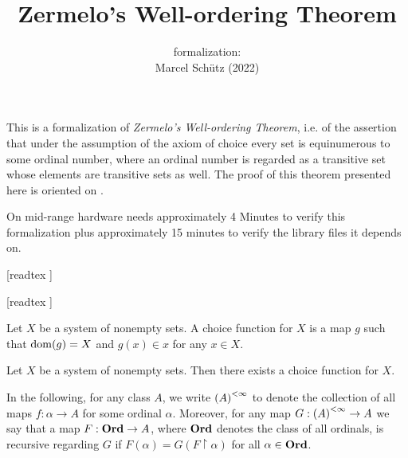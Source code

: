 \documentclass{article}
\title{Zermelo's Well-ordering Theorem}
\author{\Naproche formalization: \vspace{0.5em} \\
Marcel Schütz (2022)}
\date{}
\begin{document}
  \maketitle

  \noindent This is a formalization of \textit{Zermelo's Well-ordering Theorem},
  i.e. of the assertion that under the assumption of the axiom of choice every
  set is equinumerous to some ordinal number, where an ordinal number is
  regarded as a transitive set whose elements are transitive sets as well.
  The proof of this theorem presented here is oriented on \cite{Koepke2018}.

  On mid-range hardware \Naproche needs approximately 4 Minutes to verify this
  formalization plus approximately 15 minutes to verify the library files it
  depends on.

  \begin{forthel}

    [readtex ]

    [readtex ]

  \end{forthel}

  \begin{forthel}
    \begin{definition*}
      Let $X$ be a system of nonempty sets.
      A choice function for $X$ is a map $g$ such that $\operatorname{dom}(g) = X$ and
      $g(x) \in x$ for any $x \in X$.
    \end{definition*}

    \begin{axiom*}[Choice]
      Let $X$ be a system of nonempty sets.
      Then there exists a choice function for $X$.
    \end{axiom*}
  \end{forthel}

  \noindent In the following, for any class $A$, we write $\left(A\right)^{<\infty}$ to
  denote the collection of all maps $f : \alpha \to A$ for some ordinal
  $\alpha$.
  Moreover, for any map $G : \left(A\right)^{<\infty} \to A$ we say that a map $F : \mathbf{Ord} \to
  A$, where $\mathbf{Ord}$ denotes the class of all ordinals, is recursive regarding $G$
  if $F(\alpha) = G(F \restriction \alpha)$ for all $\alpha \in \mathbf{Ord}$.
\end{document}
